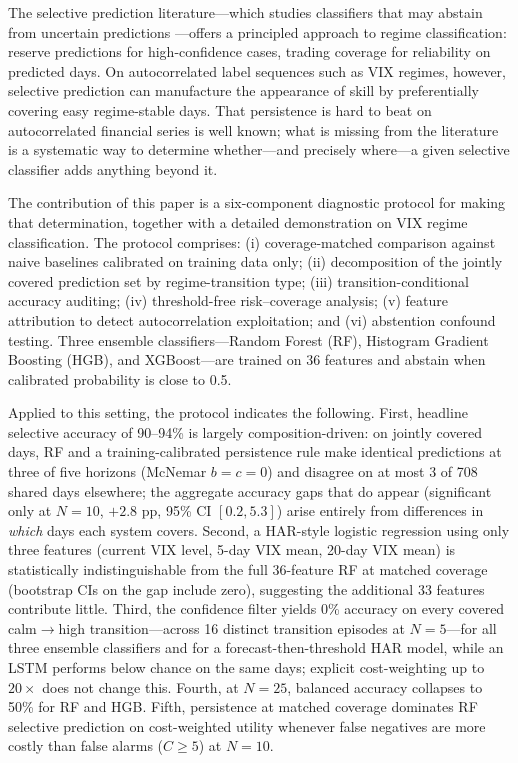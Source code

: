 \documentclass[12pt]{article}
\begin{document}
The selective prediction literature---which studies classifiers that may abstain from uncertain
predictions \citep{chow1970, bartlett2008, geifman2017}---offers a principled approach to regime
classification: reserve predictions for high-confidence cases, trading coverage for reliability
on predicted days. On autocorrelated label sequences such as VIX regimes, however, selective
prediction can manufacture the appearance of skill by preferentially covering easy regime-stable
days. That persistence is hard to beat on autocorrelated financial series is well known; what is
missing from the literature is a systematic way to determine whether---and precisely
where---a given selective classifier adds anything beyond it.

The contribution of this paper is a six-component diagnostic protocol for making that
determination, together with a detailed demonstration on VIX regime classification. The protocol
comprises: (i) coverage-matched comparison against naive baselines calibrated on training data
only; (ii) decomposition of the jointly covered prediction set by regime-transition type;
(iii) transition-conditional accuracy auditing; (iv) threshold-free risk--coverage analysis;
(v) feature attribution to detect autocorrelation exploitation; and (vi) abstention confound
testing. Three ensemble classifiers---Random Forest (RF), Histogram Gradient Boosting (HGB),
and XGBoost---are trained on 36 features and abstain when calibrated probability is close
to 0.5.

Applied to this setting, the protocol indicates the following. First, headline selective
accuracy of 90--94\% is largely composition-driven: on jointly covered days, RF and a
training-calibrated persistence rule make identical predictions at three of five horizons
(McNemar $b = c = 0$) and disagree on at most 3 of 708 shared days elsewhere; the aggregate
accuracy gaps that do appear (significant only at $N = 10$, $+2.8$ pp, 95\% CI $[0.2, 5.3]$)
arise entirely from differences in \emph{which} days each system covers. Second, a HAR-style
logistic regression using only three features (current VIX level, 5-day VIX mean, 20-day VIX
mean) is statistically indistinguishable from the full 36-feature RF at matched coverage
(bootstrap CIs on the gap include zero), suggesting the additional 33 features contribute
little. Third, the confidence filter yields 0\% accuracy on every covered calm$\to$high
transition---across 16 distinct transition episodes at $N = 5$---for all three ensemble
classifiers and for a forecast-then-threshold HAR model, while an LSTM performs below chance
on the same days; explicit cost-weighting up to $20{\times}$ does not change this. Fourth, at $N = 25$, balanced accuracy collapses to
50\% for RF and HGB. Fifth, persistence at matched coverage dominates RF selective prediction
on cost-weighted utility whenever false negatives are more costly than false alarms
($C \geq 5$) at $N = 10$.
\end{document}
